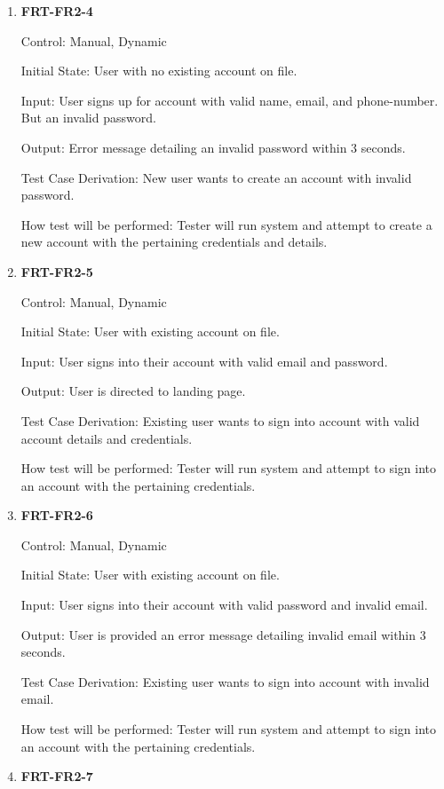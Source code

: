 \documentclass[12pt, titlepage]{article}
\begin{document}
\begin{enumerate}
\item{\textbf{FRT-FR2-4}}

Control: Manual, Dynamic
          
Initial State: User with no existing account on file.
          
Input: User signs up for account with valid name, email, and phone-number. But an invalid password.
          
Output: Error message detailing an invalid password within 3 seconds.

Test Case Derivation: New user wants to create an account with invalid password.

How test will be performed: Tester will run system and attempt to create a new account with the pertaining credentials and details. 

\item{\textbf{FRT-FR2-5}}

Control: Manual, Dynamic
          
Initial State: User with existing account on file.
          
Input: User signs into their account with valid email and password.
          
Output: User is directed to landing page.

Test Case Derivation: Existing user wants to sign into account with valid account details and credentials.
          
How test will be performed: Tester will run system and attempt to sign into an account with the pertaining credentials.
          
\item{\textbf{FRT-FR2-6}}

Control: Manual, Dynamic
          
Initial State: User with existing account on file.
          
Input: User signs into their account with valid password and invalid email.
          
Output: User is provided an error message detailing invalid email within 3 seconds.

Test Case Derivation: Existing user wants to sign into account with invalid email.
          
How test will be performed: Tester will run system and attempt to sign into an account with the pertaining credentials.

\item{\textbf{FRT-FR2-7}}


\end{enumerate}
\end{document}
